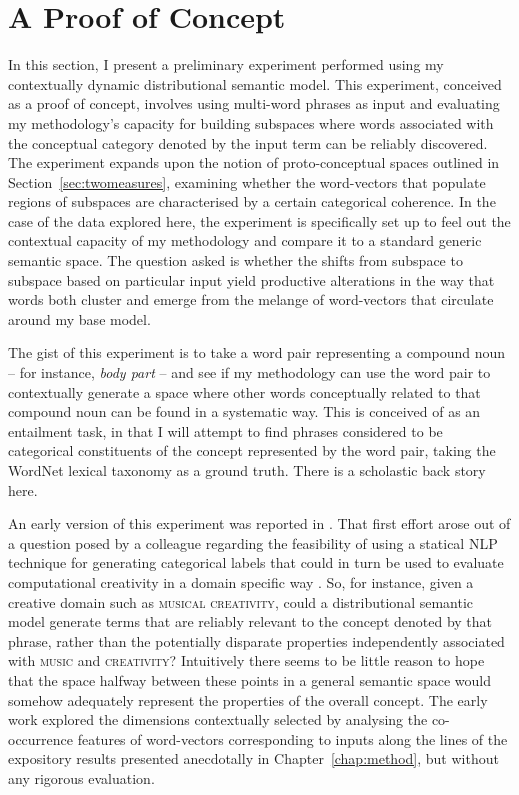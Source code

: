 \section{A Proof of Concept}\label{sec:poc}
In this section, I present a preliminary experiment performed using my contextually dynamic distributional semantic model.  This experiment, conceived as a proof of concept, involves using multi-word phrases as input and evaluating my methodology's capacity for building subspaces where words associated with the conceptual category denoted by the input term can be reliably discovered.  The experiment expands upon the notion of proto-conceptual spaces outlined in Section~\ref{sec:twomeasures}, examining whether the word-vectors that populate regions of subspaces are characterised by a certain categorical coherence.  In the case of the data explored here, the experiment is specifically set up to feel out the contextual capacity of my methodology and compare it to a standard generic semantic space.  The question asked is whether the shifts from subspace to subspace based on particular input yield productive alterations in the way that words both cluster and emerge from the melange of word-vectors that circulate around my base model.

The gist of this experiment is to take a word pair representing a compound noun -- for instance, \emph{body part} -- and see if my methodology can use the word pair to contextually generate a space where other words conceptually related to that compound noun can be found in a systematic way.  This is conceived of as an entailment task, in that I will attempt to find phrases considered to be categorical constituents of the concept represented by the word pair, taking the WordNet lexical taxonomy as a ground truth.  There is a scholastic back story here.

An early version of this experiment was reported in \cite{AgresEA2015}.  That first effort arose out of a question posed by a colleague regarding the feasibility of using a statical NLP technique for generating categorical labels that could in turn be used to evaluate computational creativity in a domain specific way \citep[for a psychological perspective on the difficulty of generating such terms in an objective way using human subjects, see][]{VanDerVeldeEA2015}.  So, for instance, given a creative domain such as \textsc{musical creativity}, could a distributional semantic model generate terms that are reliably relevant to the concept denoted by that phrase, rather than the potentially disparate properties independently associated with \textsc{music} and \textsc{creativity}?  Intuitively there seems to be little reason to hope that the space halfway between these points in a general semantic space would somehow adequately represent the properties of the overall concept.  The early work explored the dimensions contextually selected by analysing the co-occurrence features of word-vectors corresponding to inputs along the lines of the expository results presented anecdotally in Chapter~\ref{chap:method}, but without any rigorous evaluation.

